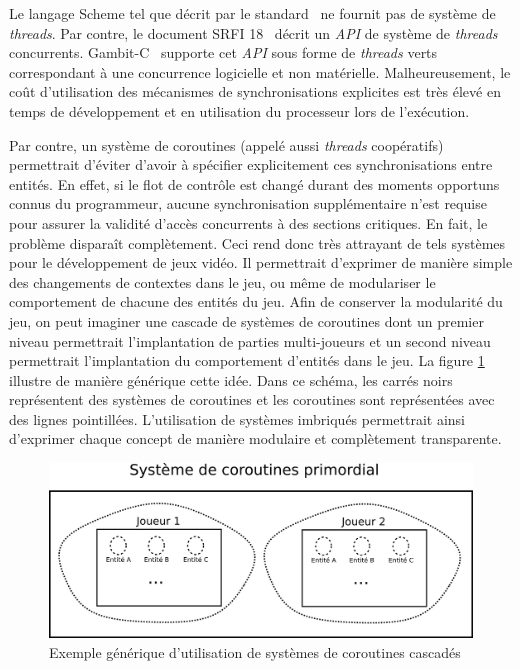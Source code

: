 \documentclass[12pt,twoside,letterpaper,francais]{book}
\begin{document}
Le langage Scheme tel que décrit par le standard~\cite{R5RS} ne
fournit pas de système de \textit{threads}. Par contre, le document
SRFI 18~\cite{SRFI18} décrit un \textit{API} de système de
\textit{threads} concurrents. Gambit-C~\cite{Gambit4} supporte cet
\textit{API} sous forme de \textit{threads} verts correspondant à une
concurrence logicielle et non matérielle. Malheureusement, le coût
d'utilisation des mécanismes de synchronisations explicites est très
élevé en temps de dévelop\-pement et en utilisation du processeur lors
de l'exécution.

Par contre, un système de coroutines (appelé aussi \textit{threads}
coopératifs) permettrait d'éviter d'avoir à spécifier explicitement
ces synchronisations entre entités. En effet, si le flot de contrôle
est changé durant des moments opportuns connus du programmeur, aucune
synchronisation supplémentaire n'est requise pour assurer la validité
d'accès concurrents à des sections critiques. En fait, le problème
disparaît complètement. Ceci rend donc très attrayant de tels systèmes
pour le dévelop\-pement de jeux vidéo. Il permettrait d'exprimer de
manière simple des changements de contextes dans le jeu, ou même de
modulariser le comportement de chacune des entités du jeu. Afin de
conserver la modularité du jeu, on peut imaginer une cascade de
systèmes de coroutines dont un premier niveau permettrait
l'implantation de parties multi-joueurs et un second niveau
permettrait l'implantation du comportement d'entités dans le jeu. La
figure \ref{Corout:usecase} illustre de manière générique cette
idée. Dans ce schéma, les carrés noirs représentent des systèmes de
coroutines et les coroutines sont représentées avec des lignes
pointillées. L'utilisation de systèmes imbriqués permettrait ainsi
d'exprimer chaque concept de manière modulaire et complètement
transparente.\\

\begin{figure}[htb!]
  \center
  \includegraphics[scale=1.2]{corout-usecase-design}
  \caption{Exemple générique d'utilisation de systèmes de coroutines
    cascadés}
  \label{Corout:usecase}
\end{figure}
\end{document}
